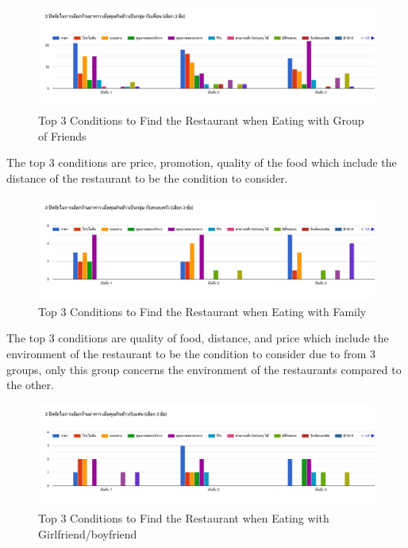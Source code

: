 \documentclass[12pt,oneside,openright,a4paper]{cpe-english-project}
\begin{document}
\begin{figure}[H]\centering
\includegraphics[width=350pt]{./images/A1Top3ConditionstoFindtheRestaurantwhenEatingwithGroupofFriends.png}
\caption{Top 3 Conditions to Find the Restaurant when Eating with Group of Friends}\label{fig:A1Top3ConditionstoFindtheRestaurantwhenEatingwithGroupofFriends}
\end{figure}\vspace{-24pt}

The top 3 conditions are price, promotion, quality of the food which include the distance of the restaurant to be the condition to consider.

\begin{figure}[H]\centering
\includegraphics[width=350pt]{./images/A1Top3ConditionstoFindtheRestaurantwhenEatingwithFamily.png}
\caption{Top 3 Conditions to Find the Restaurant when Eating with Family}\label{fig:A1Top3ConditionstoFindtheRestaurantwhenEatingwithFamily}
\end{figure}\vspace{-24pt}

The top 3 conditions are quality of food, distance, and price which include the environment of the restaurant to be the condition to consider due to from 3 groups, only this group concerns the environment of the restaurants compared to the other.

\begin{figure}[H]\centering
\includegraphics[width=350pt]{./images/A1Top3ConditionstoFindtheRestaurantwhenEatingwithGirlfriend.png}
\caption{Top 3 Conditions to Find the Restaurant when Eating with Girlfriend/boyfriend}\label{fig:A1Top3ConditionstoFindtheRestaurantwhenEatingwithGirlfriend}
\end{figure}\vspace{-24pt}
\end{document}
